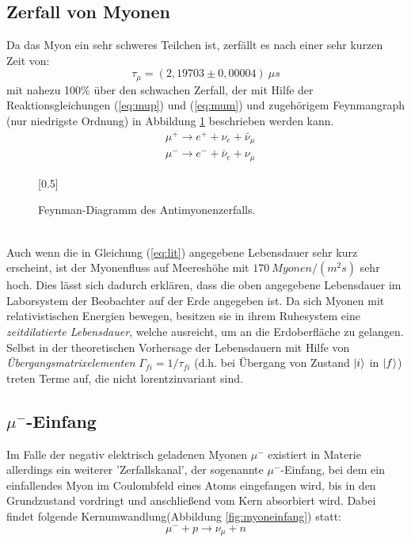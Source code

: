 	\subsection{Zerfall von Myonen}
	Da das Myon ein sehr schweres Teilchen ist, zerfällt es nach einer sehr kurzen Zeit von:\cite{PA}\\
		\begin{equation} \label{eq:lit}
			\tau_\mu = (2,19703 \pm 0,00004)\ \unit{\mu s}
		\end{equation}
	mit nahezu 100\% über den schwachen Zerfall, der mit Hilfe der Reaktionsgleichungen (\ref{eq:mup}) und (\ref{eq:mum}) und zugehörigem Feynmangraph (nur niedrigste Ordnung) in Abbildung \ref{fig:myonzerfall} beschrieben werden kann.\\
	
		\begin{align}
			&\mu^+ \longrightarrow e^+ + \nu_e + \bar{\nu}_\mu 		\label{eq:mup}\\
			&\mu^- \longrightarrow e^- + \bar{\nu}_e + \nu_\mu 		\label{eq:mum}
		\end{align}
		\begin{figure}[hp]
            \centering
            \scalebox{0.5}[0.5]{
  			
            }
            \caption{Feynman-Diagramm des Antimyonenzerfalls.}
            \label{fig:myonzerfall}
        \end{figure}
	\ \\
	Auch wenn die in Gleichung (\ref{eq:lit}) angegebene Lebensdauer sehr kurz erscheint, ist der Myonenfluss auf Meereshöhe mit $170\ \unit{Myonen/(m^2s)}$ sehr hoch. Dies lässt sich dadurch erklären, dass die oben angegebene Lebensdauer im Laborsystem der Beobachter auf der Erde angegeben ist. Da sich Myonen mit relativistischen Energien bewegen, besitzen sie in ihrem Ruhesystem eine \textit{zeitdilatierte Lebensdauer}, welche ausreicht, um an die Erdoberfläche zu gelangen. Selbst in der theoretischen Vorhersage der Lebensdauern mit Hilfe von \textit{Übergangsmatrixelementen} $\Gamma_{fi} = 1/\tau_{fi}$ (d.h. bei Übergang von Zustand $\ket{i}$ in $\ket{f}$) treten Terme auf, die nicht lorentzinvariant sind.
	
	\subsection{$\mu^-$-Einfang}
	Im Falle der negativ elektrisch geladenen Myonen $\mu^-$ existiert in Materie allerdings ein weiterer 'Zerfallskanal', der sogenannte $\mu^-$-Einfang, bei dem ein einfallendes Myon im Coulombfeld eines Atoms eingefangen wird, bis in den Grundzustand vordringt und anschließend vom Kern absorbiert wird. Dabei findet folgende Kernumwandlung(Abbildung \ref{fig:myoneinfang}) statt:
		\begin{equation*}
			\mu^- + p \longrightarrow  \nu_\mu + n 
		\end{equation*}
		
